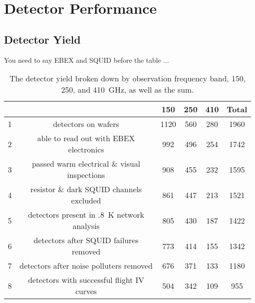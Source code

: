 \chapter{Detector Performance}
\label{detector_performance_chapter}

\section{Detector Yield}
\label{sec:yield}


You need to say \ac{EBEX} and \ac{SQUID} before the table ...

\begin{table}[ht!]
\begin{center}
\begin{tabular}{lc|c|c|c|c}
 & & \bf150 & \bf250 & \bf410 & \bf Total \\
\hline 1& detectors on wafers & 1120 & 560 & 280 & 1960 \\
\hline 2& able to read out with \ac{EBEX} electronics & 992 & 496 & 254 & 1742 \\
\hline 3& passed warm electrical \& visual inspections & 908 & 455 & 232 & 1595 \\
\hline 4& resistor \& dark \ac{SQUID} channels excluded & 861 & 447 & 213 & 1521 \\
\hline 5& detectors present in .8~K network analysis & 805 & 430 & 187 & 1422 \\
\hline 6& detectors after SQUID failures removed & 773 & 414 & 155 & 1342 \\
\hline 7& detectors after noise polluters removed & 676 & 371 & 133 & 1180 \\
\hline 8& detectors with successful flight IV curves & 504 & 342 & 109 & 955 \\
\hline
\end{tabular}
\end{center}
\caption{The detector yield broken down by observation frequency band, 150, 250, and 410~GHz, as well as the sum.}
\label{yield_table}
\end{table}


